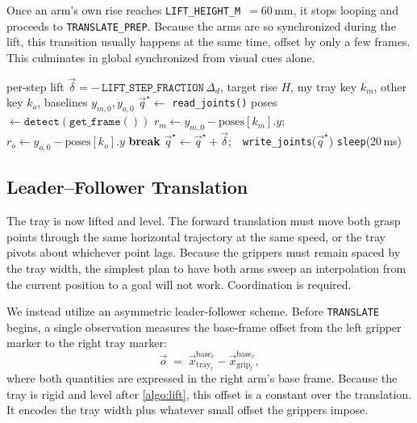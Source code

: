 Once an arm's own rise reaches \texttt{LIFT\_HEIGHT\_M}~$=60$\,mm, it stops looping and proceeds to \texttt{TRANSLATE\_PREP}. Because the arms are so synchronized during the lift, this transition usually happens at the same time, offset by only a few frames. This culminates in global synchronized from visual cues alone.

\begin{algorithm} [h]
\caption{Tilt-aware LIFTING}
\label{algo:lift}
\begin{algorithmic}[1]
  \REQUIRE per-step lift $\vec{\delta}=-\,\texttt{LIFT\_STEP\_FRACTION}\,\Delta_d$,
           target rise $H$, my tray key $k_m$, other key $k_o$,
           baselines $y_{m,0}, y_{o,0}$
  \STATE $\vec{q}^\star \gets $ \texttt{read\_joints()}
  \LOOP
    \STATE poses $\gets \texttt{detect}(\texttt{get\_frame}())$
    \STATE $r_m \gets y_{m,0}-\text{poses}[k_m].y$;\ \
           $r_o \gets y_{o,0}-\text{poses}[k_o].y$
     \textbf{break} 
    \ENDIF
       \STATE $\vec{q}^\star \gets \vec{q}^\star + \vec{\delta}$;\ \
              \texttt{write\_joints}($\vec{q}^\star$)
    \ENDIF
    \STATE \texttt{sleep}(20\,ms)
  \ENDLOOP

\end{algorithmic}
\end{algorithm}

\subsection{Leader--Follower Translation}
\label{sec:translate}
The tray is now lifted and level. The forward translation must move both grasp points through the same horizontal trajectory at the same speed, or the tray pivots about whichever point lags. Because the grippers must remain spaced by the tray width, the simplest plan to have both arms sweep an interpolation from the current position to a goal will not work. Coordination is required.

We instead utilize an asymmetric leader-follower scheme. Before
\texttt{TRANSLATE} begins, a single observation measures the
base-frame offset from the left gripper marker to the
right tray marker:
\begin{equation}
\label{eq:offset}
  \vec{o} \;=\; \vec{x}_{\text{tray}_r}^{\text{base}_r}
           - \vec{x}_{\text{grip}_l}^{\text{base}_r},
\end{equation}
where both quantities are expressed in the right arm's base
frame. Because the tray is rigid and level after \cref{algo:lift},
this offset is a constant over the translation. It encodes the
tray width plus whatever small offset the grippers impose.

